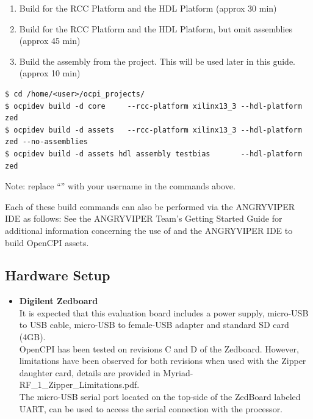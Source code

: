 \begin{flushleft}
\begin{enumerate}
	\item Build  for the  RCC Platform and the  HDL Platform (approx 30 min)
	\item Build  for the  RCC Platform and the  HDL Platform, but omit assemblies (approx 45 min)
	\item Build the  assembly from the  project. This will be used later in this guide. (approx 10 min)
\end{enumerate}
\begin{lstlisting}[showspaces=false]
$ cd /home/<user>/ocpi_projects/
$ ocpidev build -d core     --rcc-platform xilinx13_3 --hdl-platform zed
$ ocpidev build -d assets   --rcc-platform xilinx13_3 --hdl-platform zed --no-assemblies
$ ocpidev build -d assets hdl assembly testbias       --hdl-platform zed
\end{lstlisting}
Note: replace ``'' with your username in the commands above.\\\medskip

Each of these build commands can also be performed via the ANGRYVIPER IDE as follows:
\OcpidevBuild
See the ANGRYVIPER Team's Getting Started Guide for additional information concerning the use of  and the ANGRYVIPER IDE to build OpenCPI assets.

\subsection{Hardware Setup}
\begin{itemize}
\item \textbf{Digilent Zedboard}\\ \medskip
It is expected that this evaluation board includes a power supply, micro-USB to USB cable, micro-USB to female-USB adapter and standard SD card (4GB). \\ \medskip
OpenCPI has been tested on revisions C and D of the Zedboard. However, limitations have been observed for both revisions when used with the Zipper daughter card, details are provided in Myriad-RF\_1\_Zipper\_Limitations.pdf.\\ \medskip
The micro-USB serial port located on the top-side of the ZedBoard labeled UART, can be used to access the serial connection with the processor.\medskip


\end{itemize}
\end{flushleft}
